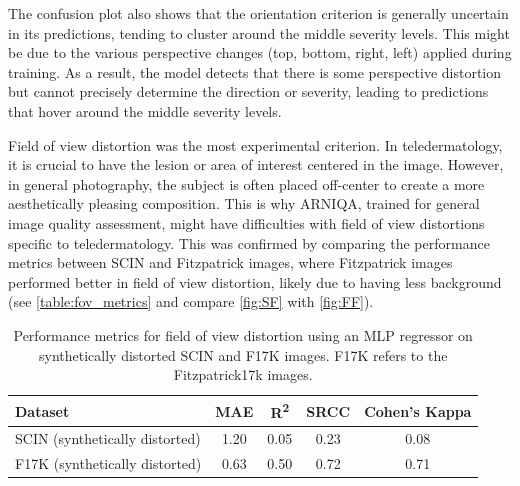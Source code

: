 \vspace{\baselineskip}
\noindent
The confusion plot also shows that the orientation criterion is generally uncertain in its predictions, tending to cluster around the middle severity levels. This might be due to the various perspective changes (top, bottom, right, left) applied during training. As a result, the model detects that there is some perspective distortion but cannot precisely determine the direction or severity, leading to predictions that hover around the middle severity levels.\par
\vspace{\baselineskip}
\noindent
Field of view distortion was the most experimental criterion. In teledermatology, it is crucial to have the lesion or area of interest centered in the image. However, in general photography, the subject is often placed off-center to create a more aesthetically pleasing composition. This is why ARNIQA, trained for general image quality assessment, might have difficulties with field of view distortions specific to teledermatology. This was confirmed by comparing the performance metrics between SCIN and Fitzpatrick images, where Fitzpatrick images performed better in field of view distortion, likely due to having less background (see \autoref{table:fov_metrics} and compare \autoref{fig:SF} with \autoref{fig:FF}). \par
 \begin{table}[ht]
    \centering
    \begin{tabular}{|l|c|c|c|c|}
        \hline
        \textbf{Dataset} & \textbf{MAE} & \textbf{R\textsuperscript{2}} & \textbf{SRCC} & \textbf{Cohen's Kappa} \\
        \hline
        SCIN (synthetically distorted) & 1.20 & 0.05 & 0.23 & 0.08 \\
        F17K (synthetically distorted) & 0.63 & 0.50 & 0.72 & 0.71 \\
        \hline
    \end{tabular}
    \caption{Performance metrics for field of view distortion using an MLP regressor on synthetically distorted SCIN and F17K images. F17K refers to the Fitzpatrick17k images.}
    \label{table:fov_metrics}
\end{table}
